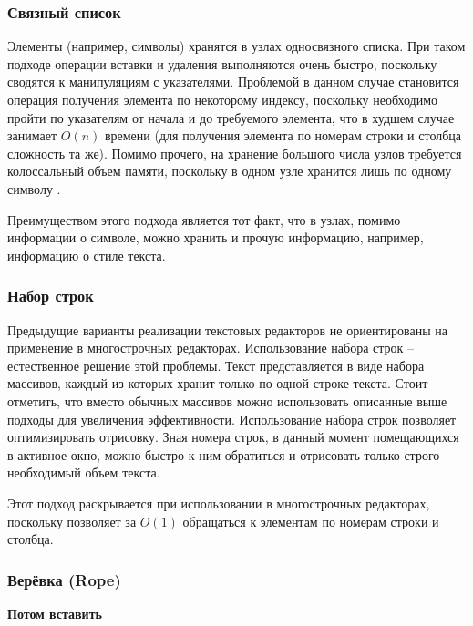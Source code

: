 \documentclass{fefu}
\begin{document}
			\subsubsection{Связный список}
				\par Элементы (например, символы) хранятся в узлах односвязного списка. При 
				таком подходе операции вставки и удаления выполняются очень быстро, поскольку 
				сводятся к манипуляциям с указателями. Проблемой в данном случае становится 
				операция получения элемента по некоторому индексу, поскольку необходимо пройти 
				по указателям от начала и до требуемого элемента, что в худшем случае занимает 
				$O(n)$ времени (для получения элемента по номерам строки и столбца сложность та
				же). Помимо прочего, на хранение большого числа узлов требуется колоссальный 
				объем памяти, поскольку в одном узле хранится лишь по одному символу
				\cite{LinkedListReference}. 
				\par Преимуществом этого подхода является тот факт, что в узлах, помимо
				информации о символе, можно хранить и прочую информацию, например, информацию
				о стиле текста.
			\subsubsection{Набор строк}
				\par Предыдущие варианты реализации текстовых редакторов не ориентированы на
				применение в многострочных редакторах. Использование набора строк --
				естественное решение этой проблемы. Текст представляется в виде набора
				массивов, каждый из которых хранит только по одной строке текста. Стоит
				отметить, что вместо обычных массивов можно использовать описанные выше
				подходы для увеличения эффективности. Использование набора строк позволяет
				оптимизировать отрисовку. Зная номера строк, в данный момент помещающихся в 
				активное окно, можно быстро к ним обратиться и отрисовать только строго
				необходимый объем текста. 
				\par Этот подход раскрывается при использовании в многострочных редакторах,
				поскольку позволяет за $O(1)$ обращаться к элементам по номерам строки и
				столбца.
			\subsubsection{Верёвка (Rope)}
				\par \textbf{Потом вставить}
\end{document}
